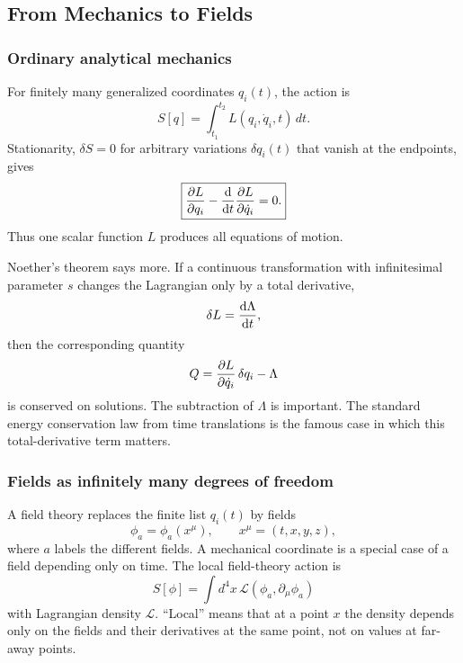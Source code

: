 \documentclass[../main.tex]{subfiles}
\begin{document}
\subsection{From Mechanics to Fields}

\subsubsection*{Ordinary analytical mechanics}
For finitely many generalized coordinates $q_i(t)$, the action is
\begin{equation}
  S[q]=\int_{t_1}^{t_2} L(q_i,\dot q_i,t)\,dt .
  \label{eq:lec23_mechanical_action}
\end{equation}
Stationarity, $\delta S=0$ for arbitrary variations $\delta q_i(t)$ that vanish
at the endpoints, gives
\begin{equation}
  \boxed{\pdv{L}{q_i}-\dv{t}\pdv{L}{\dot q_i}=0 .}
  \label{eq:lec23_mechanical_el}
\end{equation}
Thus one scalar function $L$ produces all equations of motion.

Noether's theorem says more.  If a continuous transformation with infinitesimal
parameter $s$ changes the Lagrangian only by a total derivative,
\begin{equation}
  \delta L=\dv{\Lambda}{t},
  \label{eq:lec23_mech_noether_condition}
\end{equation}
then the corresponding quantity
\begin{equation}
  Q=\pdv{L}{\dot q_i}\,\delta q_i-\Lambda
  \label{eq:lec23_mech_noether_charge}
\end{equation}
is conserved on solutions.  The subtraction of $\Lambda$ is important.  The
standard energy conservation law from time translations is the famous case in
which this total-derivative term matters.

\subsubsection*{Fields as infinitely many degrees of freedom}
A field theory replaces the finite list $q_i(t)$ by fields
\begin{equation}
  \phi_a=\phi_a(x^\mu),\qquad x^\mu=(t,x,y,z),
\end{equation}
where $a$ labels the different fields.  A mechanical coordinate is a special
case of a field depending only on time.  The local field-theory action is
\begin{equation}
  \boxed{S[\phi]=\int d^4x\,\mathcal L\!\left(\phi_a,\partial_\mu\phi_a\right)}
  \label{eq:lec23_field_action}
\end{equation}
with Lagrangian density $\mathcal L$.  ``Local'' means that at a point $x$ the
density depends only on the fields and their derivatives at the same point, not
on values at far-away points.
\end{document}
